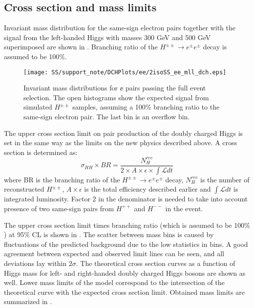 
\subsection{Cross section and mass limits}

Invariant mass distribution for the same-sign electron pairs together with the signal from the left-handed Higgs 
with masses 300 GeV and 500 GeV superimposed are shown in .
Branching ratio of the $H^{\pm\pm} \to e^{\pm}e^{\pm}$ decay is assumed to be 100$\%$.

\begin{figure}[h]
\begin{center}
\texttt{[image: SS/support\_note/DCHPlots/ee/2isoSS\_ee\_mll\_dch.eps]}
\caption{Invariant mass distributions for $\ee$ pairs passing the full event selection. 
The open histograms show the expected signal from simulated $H^{\pm\pm}$ samples,
assuming a 100\% branching ratio to the same-sign electron pair. The last bin is an overflow bin.}
\label{fig:signal_mass}
\end{center}
\end{figure}

The upper cross section limit on pair production of the doubly charged Higgs is set in the same way as the limits on the new physics described above.
A cross section is determined as:
\begin{equation}
 \sigma_{HH}\times BR =\frac{N_{H}^{rec}}{2\times A\times \epsilon \times \int \mathscr{L} dt}
\end{equation}
where BR is the branching ratio of the $H^{\pm\pm} \to e^{\pm}e^{\pm}$ decay, 
$N_{H}^{rec}$ is the number of reconstructed $H^{\pm\pm}$, $A\times \epsilon$ is the total efficiency described earlier and
$\int \mathscr{L} dt$ is integrated luminosity.
Factor 2 in the denominator is needed to take into account presence of two same-sign pairs from $H^{++}$ and $H^{--}$ in the event.

The upper cross section limit times branching ratio (which is assumed to be 100$\%$) at 95$\%$ CL is shown in .
The scatter between mass bins is caused by fluctuations of the predicted background due to the low statistics in bins.
A good agreement between expected and observed limit lines can be seen, and all deviations lay within $2\sigma$.
The theoretical cross section curves as a function of Higgs mass for left- and right-handed doubly charged Higgs bosons 
are shown as well.
Lower mass limits of the model correspond to the intersection of the theoretical curve with the expected cross section limit. Obtained
mass limits are summarized in .

